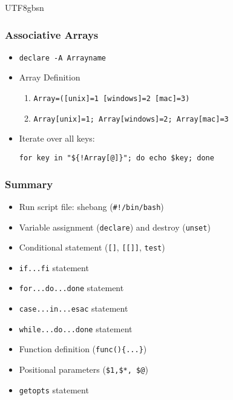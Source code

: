 \documentclass[red]{beamer}
\newcommand*{\lstverb}{\lstinline[style=caret]}
\begin{document}
\begin{CJK*}{UTF8}{gbsn}
\begin{frame}
\frametitle{Associative Arrays}
\begin{itemize}
	\item \lstverb|declare -A Arrayname|
	\item Array Definition
	\begin{enumerate}
		\item \lstverb|Array=([unix]=1 [windows]=2 [mac]=3)|
		\item \lstverb|Array[unix]=1; Array[windows]=2; Array[mac]=3|
	\end{enumerate}
	\item Iterate over all keys:
	\begin{lstlisting}
for key in "${!Array[@]}"; do echo $key; done
	\end{lstlisting}
\end{itemize}
\end{frame}


\begin{frame}
\frametitle{Summary}
\begin{itemize}
	\item Run script file: shebang (\lstverb|#!/bin/bash|)
	\item Variable assignment (\lstverb|declare|) and 
		destroy (\lstverb|unset|)
	\item Conditional statement (\lstverb|[]|, 
		\lstverb|[[]]|, \lstverb|test|)
	\item \lstverb|if...fi| statement
	\item \lstverb|for...do...done| statement
	\item \lstverb|case...in...esac| statement
	\item \lstverb|while...do...done| statement
	\item Function definition (\lstverb|func(){...}|)
	\item Positional parameters (\lstverb|$1,$*, $@|)
	\item \lstverb|getopts| statement 
\end{itemize}
\end{frame}

\end{CJK*}
\end{document}
